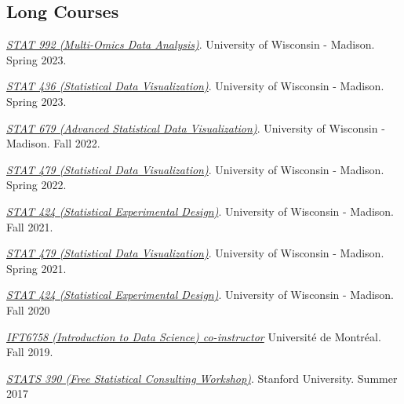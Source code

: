 \documentclass[letterpaper]{article}
\renewenvironment{itemize}{
  \begin{list}{}{
    \setlength{\leftmargin}{1.5em}
  }
}{
  \end{list}
}
\begin{document}
\subsection*{Long Courses}

\begin{itemize}
\item \textit{\href{https://krisrs1128.github.io/stat992_s23/}{STAT 992 (Multi-Omics Data Analysis)}}. 
University of Wisconsin - Madison. Spring 2023.
\item \textit{\href{https://krisrs1128.github.io/stat436_s23/}{STAT 436 (Statistical Data Visualization)}}.
University of Wisconsin - Madison. Spring 2023.
\item \textit{\href{https://krisrs1128.github.io/stat679_notes/}{STAT 679 (Advanced Statistical Data Visualization)}}.
University of Wisconsin - Madison. Fall 2022.
\item \textit{\href{https://github.com/krisrs1128/stat479_s22}{STAT 479 (Statistical Data Visualization)}}.
University of Wisconsin - Madison. Spring 2022.
\item \textit{\href{https://krisrs1128.github.io/stat424_f21}{STAT 424 (Statistical Experimental Design)}}.
University of Wisconsin - Madison. Fall 2021.
\item \textit{\href{https://krisrs1128/github.io/stat479/}{STAT 479 (Statistical Data Visualization)}}.
University of Wisconsin - Madison. Spring 2021.
\item \textit{\href{https://mediaspace.wisc.edu/channel/STAT424Fall2020/180027062}{STAT
424 (Statistical Experimental Design)}}. University of Wisconsin - Madison. Fall
2020
\item \textit{\href{https://ift6758.github.io/}{IFT6758 (Introduction to Data Science) co-instructor}}
Universit\'e de Montr\'eal. Fall 2019.
\item \href{https://www.overleaf.com/10240923zrkwyvndkwnn#/37916755/}{\textit{STATS 390 (Free Statistical Consulting Workshop)}}.
  Stanford University. Summer 2017
\end{itemize}
\end{document}
